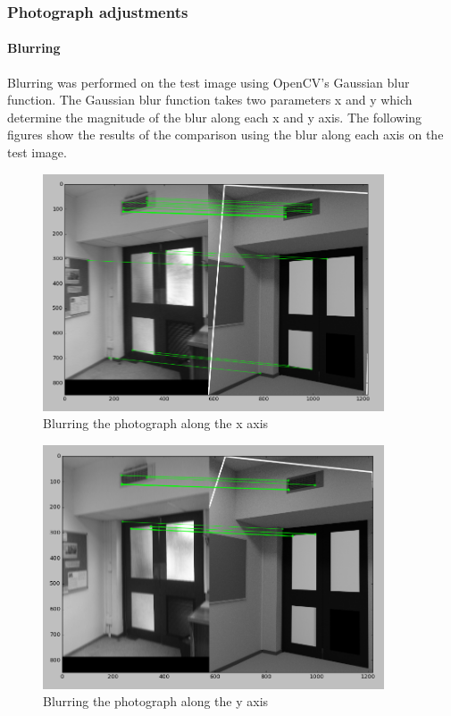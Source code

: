 \documentclass[11pt,a4paper]{report}
\begin{document}
			\subsubsection{Photograph adjustments}
				\paragraph{Blurring}
					Blurring was performed on the test image using OpenCV's Gaussian blur function. The Gaussian blur function takes two parameters x and y which determine the magnitude of the blur along each x and y axis. The following figures show the results of the comparison using the blur along each axis on the test image.
					\begin{figure}[H]
						\centering
						\includegraphics[width=0.9\textwidth]{x_blur}
						\caption{Blurring the photograph along the x axis}
						\label{fig:x_blur}
					\end{figure}
					
					\begin{figure}[H]
						\centering
						\includegraphics[width=0.9\textwidth]{y_blur}
						\caption{Blurring the photograph along the y axis}
						\label{fig:y_blur}
					\end{figure}
					
\end{document}
